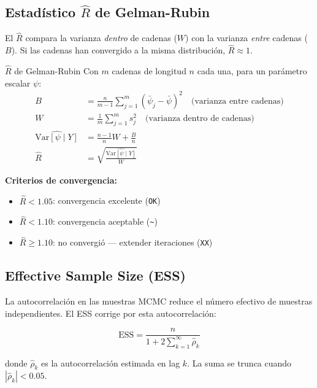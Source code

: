\documentclass[12pt, a4paper]{article}
\theoremstyle{plain}
\theoremstyle{definition}
\theoremstyle{remark}
\newcommand{\Var}[1]{\text{Var}\!\left[#1\right]}
\begin{document}
\subsection{Estadístico $\hat{R}$ de Gelman-Rubin}

El $\hat{R}$  compara la varianza \emph{dentro} de cadenas
($W$) con la varianza \emph{entre} cadenas ($B$). Si las cadenas han convergido a
la misma distribución, $\hat{R} \approx 1$.

\begin{teoremabox}{$\hat{R}$ de Gelman-Rubin}
Con $m$ cadenas de longitud $n$ cada una, para un parámetro escalar $\psi$:
\begin{align}
  B &= \frac{n}{m-1}\sum_{j=1}^m (\bar{\psi}_j - \bar{\psi})^2
  \quad \text{(varianza entre cadenas)} \\
  W &= \frac{1}{m}\sum_{j=1}^m s_j^2
  \quad \text{(varianza dentro de cadenas)} \\
  \widehat{\Var{\psi \mid Y}} &= \frac{n-1}{n}W + \frac{B}{n} \\
  \hat{R} &= \sqrt{\frac{\widehat{\Var{\psi \mid Y}}}{W}}
  \label{eq:rhat}
\end{align}

\textbf{Criterios de convergencia:}
\begin{itemize}[noitemsep]
  \item $\hat{R} < 1.05$: convergencia excelente (\texttt{OK})
  \item $\hat{R} < 1.10$: convergencia aceptable (\texttt{\textasciitilde})
  \item $\hat{R} \geq 1.10$: no convergió — extender iteraciones (\texttt{XX})
\end{itemize}
\end{teoremabox}

\subsection{Effective Sample Size (ESS)}

La autocorrelación en las muestras MCMC reduce el número efectivo de
muestras independientes. El ESS corrige por esta autocorrelación:

\begin{equation}
  \text{ESS} = \frac{n}{1 + 2\sum_{k=1}^{\infty}\hat{\rho}_k}
  \label{eq:ess}
\end{equation}

donde $\hat{\rho}_k$ es la autocorrelación estimada en lag $k$.
La suma se trunca cuando $|\hat{\rho}_k| < 0.05$.
\end{document}
